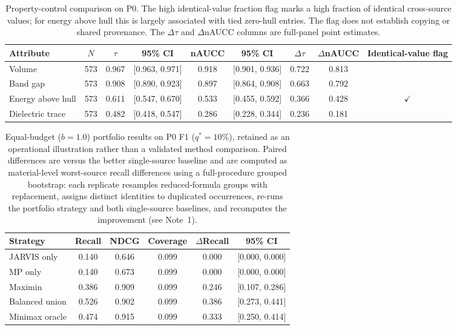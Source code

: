 \documentclass[11pt]{article}
\begin{document}
\begin{table}[htbp]
\scriptsize
\setlength{\tabcolsep}{2pt}
\centering
\caption{Property-control comparison on P0. The high identical-value fraction flag marks a high fraction of identical cross-source values; for energy above hull this is largely associated with tied zero-hull entries. The flag does not establish copying or shared provenance. The $\Delta\tau$ and $\Delta$nAUCC columns are full-panel point estimates.}
\label{tab:si_controls}
\begin{tabular}{lcccccccc}
\toprule
Attribute & $N$ & $\tau$ & 95\% CI & nAUCC & 95\% CI & $\Delta\tau$ & $\Delta$nAUCC & Identical-value flag \\
\midrule
Volume & 573 & 0.967 & [0.963, 0.971] & 0.918 & [0.901, 0.936] & 0.722 & 0.813 &  \\
Band gap & 573 & 0.908 & [0.890, 0.923] & 0.897 & [0.864, 0.908] & 0.663 & 0.792 &  \\
Energy above hull & 573 & 0.611 & [0.547, 0.670] & 0.533 & [0.455, 0.592] & 0.366 & 0.428 & $\checkmark$ \\
Dielectric trace & 573 & 0.482 & [0.418, 0.547] & 0.286 & [0.228, 0.344] & 0.236 & 0.181 &  \\
\bottomrule
\end{tabular}
\end{table}


\begin{table}[htbp]
\small
\setlength{\tabcolsep}{4pt}
\centering
\caption{Equal-budget ($b=1.0$) portfolio results on P0 F1 ($q^*=10\%$), retained as an operational illustration rather than a validated method comparison.
Paired differences are versus the better single-source baseline and are computed as material-level worst-source recall differences using a full-procedure grouped bootstrap: each replicate resamples reduced-formula groups with replacement, assigns distinct identities to duplicated occurrences, re-runs the portfolio strategy and both single-source baselines, and recomputes the improvement (see Note~1).}
\label{tab:si_portfolio}
\begin{tabular}{lccccc}
\toprule
Strategy & Recall & NDCG & Coverage & $\Delta$Recall & 95\% CI \\
\midrule
JARVIS only & 0.140 & 0.646 & 0.099 & 0.000 & [0.000, 0.000] \\
MP only & 0.140 & 0.673 & 0.099 & 0.000 & [0.000, 0.000] \\
Maximin & 0.386 & 0.909 & 0.099 & 0.246 & [0.107, 0.286] \\
Balanced union & 0.526 & 0.902 & 0.099 & 0.386 & [0.273, 0.441] \\
Minimax oracle & 0.474 & 0.915 & 0.099 & 0.333 & [0.250, 0.414] \\
\bottomrule
\end{tabular}
\end{table}
\end{document}
